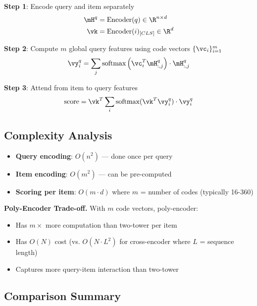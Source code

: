 \textbf{Step 1}: Encode query and item separately
\begin{align}
\mH^q &= \text{Encoder}(q) \in \R^{n \times d} \\
\vk &= \text{Encoder}(i)_{[CLS]} \in \R^d
\end{align}

\textbf{Step 2}: Compute $m$ global query features using code vectors $\{\vc_i\}_{i=1}^m$
\begin{equation}
\vy_i^q = \sum_j \text{softmax}\left(\vc_i^T \mH^q_{:,j}\right) \cdot \mH^q_{:,j}
\end{equation}

\textbf{Step 3}: Attend from item to query features
\begin{equation}
\text{score} = \vk^T \sum_i \text{softmax}(\vk^T \vy_i^q) \cdot \vy_i^q
\end{equation}

\subsection{Complexity Analysis}

\begin{itemize}
    \item \textbf{Query encoding}: $O(n^2)$ — done once per query
    \item \textbf{Item encoding}: $O(m^2)$ — can be pre-computed
    \item \textbf{Scoring per item}: $O(m \cdot d)$ where $m$ = number of codes (typically 16-360)
\end{itemize}

\textbf{Poly-Encoder Trade-off.} With $m$ code vectors, poly-encoder:
\begin{itemize}
    \item Has $m \times$ more computation than two-tower per item
    \item Has $O(N)$ cost (vs. $O(N \cdot L^2)$ for cross-encoder where $L$ = sequence length)
    \item Captures more query-item interaction than two-tower
\end{itemize}

\subsection{Comparison Summary}

